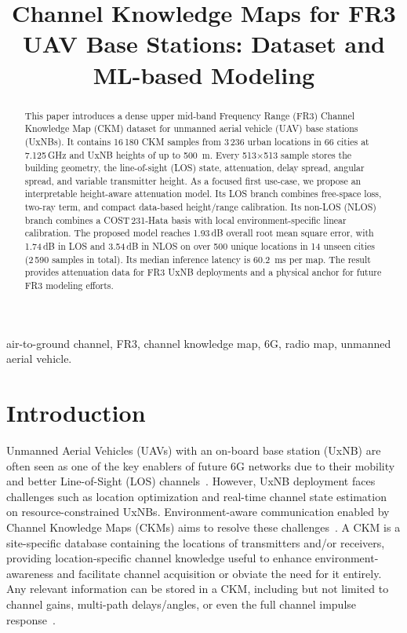 \documentclass[10pt,conference,letterpaper]{IEEEtran}
\title{Channel Knowledge Maps for FR3 UAV Base Stations: Dataset and ML-based Modeling}
\author{\IEEEauthorblockN{Guillem Moreno Garcia, Sergi Abadal, Evgenii Vinogradov}
\IEEEauthorblockA{Universitat Polit\`ecnica de Catalunya (UPC), Barcelona, Spain\\
guillem.moreno.garcia@estudiantat.upc.edu}}
\begin{document}
\maketitle

\begin{abstract}
This paper introduces a dense upper mid-band Frequency Range (FR3) Channel Knowledge Map (CKM) dataset for unmanned aerial vehicle (UAV) base stations (UxNBs). It contains 16\,180 CKM samples from 3\,236 urban locations in 66 cities at {7.125}\,{GHz} and UxNB heights of up to \SI{500}{m}. Every 513$\times$513 sample stores the building geometry, the line-of-sight (LOS) state, attenuation, delay spread, angular spread, and variable transmitter height. As a focused first use-case, we propose an interpretable height-aware attenuation model. Its LOS branch combines free-space loss, two-ray term, and compact data-based height/range calibration. Its non-LOS (NLOS) branch combines a COST\,231-Hata basis with local environment-specific linear calibration. The proposed model reaches {1.93}\,{dB} overall root mean square error, with {1.74}\,{dB} in LOS and {3.54}\,{dB} in NLOS on over 500 unique locations in 14 unseen cities (2\,590 samples in total). Its median inference latency is \SI{60.2}{ms} per map. The result provides attenuation data for FR3 UxNB deployments and a physical anchor for future FR3 modeling efforts.
\end{abstract}

\begin{IEEEkeywords}
air-to-ground channel, FR3, channel knowledge map, 6G, radio map, unmanned aerial vehicle.
\end{IEEEkeywords}

\section{Introduction}
Unmanned Aerial Vehicles (UAVs) with an on-board base station (UxNB) are often seen as one of the key enablers of future 6G networks due to their mobility and better Line-of-Sight (LOS) channels~\cite{Vinogradov2018,Geraci2022ntn}. However, UxNB deployment faces challenges such as location optimization and real-time channel state estimation on resource-constrained UxNBs. Environment-aware communication enabled by Channel Knowledge Maps (CKMs) aims to resolve these challenges~\cite{ckmtutorial2024}. A CKM is a site-specific database containing the locations of transmitters and/or receivers, providing location-specific channel knowledge useful to enhance environment-awareness and facilitate channel acquisition or obviate the need for it entirely. Any relevant information can be stored in a CKM, including but not limited to channel gains, multi-path delays/angles, or even the full channel impulse response~\cite{zengx2021ckm}.
\end{document}
